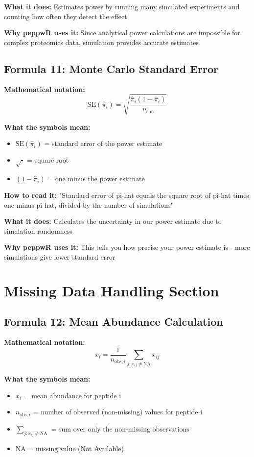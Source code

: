 \documentclass[11pt]{article}
\begin{document}
\textbf{What it does:} Estimates power by running many simulated experiments and counting how often they detect the effect

\textbf{Why peppwR uses it:} Since analytical power calculations are impossible for complex proteomics data, simulation provides accurate estimates

\subsection{Formula 11: Monte Carlo Standard Error}

\textbf{Mathematical notation:}
\[\text{SE}(\hat{\pi}_i) = \sqrt{\frac{\hat{\pi}_i(1-\hat{\pi}_i)}{n_{\text{sim}}}}\]

\textbf{What the symbols mean:}
\begin{itemize}
\item $\text{SE}(\hat{\pi}_i)$ = standard error of the power estimate
\item $\sqrt{\cdot}$ = square root
\item $(1-\hat{\pi}_i)$ = one minus the power estimate
\end{itemize}

\textbf{How to read it:} "Standard error of pi-hat equals the square root of pi-hat times one minus pi-hat, divided by the number of simulations"

\textbf{What it does:} Calculates the uncertainty in our power estimate due to simulation randomness

\textbf{Why peppwR uses it:} This tells you how precise your power estimate is - more simulations give lower standard error

\section{Missing Data Handling Section}

\subsection{Formula 12: Mean Abundance Calculation}

\textbf{Mathematical notation:}
\[\bar{x}_i = \frac{1}{n_{\text{obs},i}} \sum_{j: x_{ij} \neq \text{NA}} x_{ij}\]

\textbf{What the symbols mean:}
\begin{itemize}
\item $\bar{x}_i$ = mean abundance for peptide i
\item $n_{\text{obs},i}$ = number of observed (non-missing) values for peptide i
\item $\sum_{j: x_{ij} \neq \text{NA}}$ = sum over only the non-missing observations
\item $\text{NA}$ = missing value (Not Available)
\end{itemize}
\end{document}
